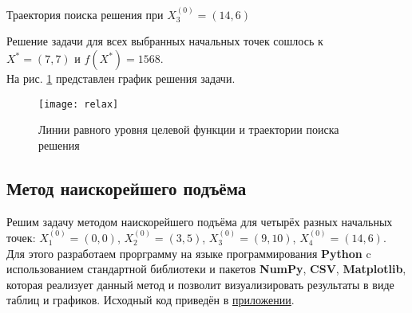 \begin{table}[H]
\begin{center}
	\caption{Траектория поиска решения при $X_3^{(0)} = (14, 6)$}
	\label{tab:trajectory-relax-3}
	\def\tabcolsep{10pt}
	\def\arraystretch{1.23}
	\fontsize{13}{14}\selectfont
\end{center}
\end{table}

Решение задачи для всех выбранных начальных точек сошлось к\\ $X^* = (7, 7)$ и $f(X^*) = 1568$.\\

На рис. \ref{pic:relax} представлен график решения задачи.

\begin{figure}[H]
\begin{center}
	\texttt{[image: relax]}
	\caption{Линии равного уровня целевой функции и траектории поиска решения}
	\label{pic:relax}
\end{center}
\end{figure}


\subsection{Метод наискорейшего подъёма}

Решим задачу методом наискорейшего подъёма для четырёх разных начальных точек: $X_1^{(0)} = (0, 0)$, $X_2^{(0)} = (3, 5)$, $X_3^{(0)} = (9, 10)$, $X_4^{(0)} = (14, 6)$.\\

Для этого разработаем прорграмму на языке программирования \textbf{Python} c использованием стандартной библиотеки и пакетов \textbf{NumPy}, \textbf{CSV}, \textbf{Matplotlib}, которая реализует данный метод и позволит визуализировать результаты в виде таблиц и графиков.  Исходный код приведён в \hyperref[sec:application]{приложении}.\\

